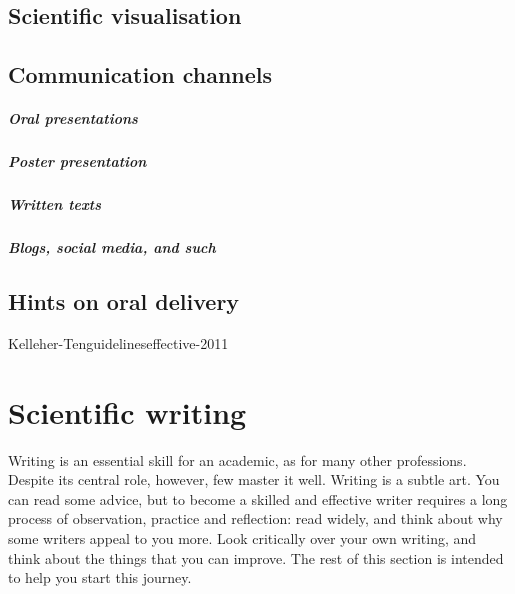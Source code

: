 \documentclass{tufte-book}
\begin{document}
\section{Scientific visualisation}


\section{Communication channels}

\paragraph{Oral presentations}

\paragraph{Poster presentation}

\paragraph{Written texts}

\paragraph{Blogs, social media, and such}


\section{Hints on oral delivery}



Kelleher-Tenguidelineseffective-2011




\chapter{Scientific writing}


Writing is an essential skill for an academic, as for many other professions.  Despite its central role, however, few master it well. Writing is a subtle art. You can read some advice, but to become a skilled and effective writer requires a long process of observation, practice and reflection: read widely, and think about why some writers appeal to you more. Look critically over your own writing, and think about the things that you can improve. The rest of this section is intended to help you start this journey. 
\end{document}
